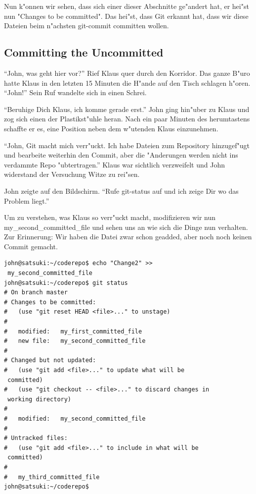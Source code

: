 Nun k"onnen wir sehen, dass sich einer dieser Abschnitte ge"andert hat, er hei"st nun "Changes to be committed". Das hei"st, dass Git erkannt hat, dass wir diese Dateien beim n"achsten git-commit committen wollen.

\subsection{Committing the Uncommitted}

\begin{trenches}
``John, was geht hier vor?'' Rief Klaus quer durch den Korridor. Das ganze B"uro hatte Klaus in den letzten 15 Minuten die H"ande auf den Tisch schlagen h"oren.  ``John!'' Sein Ruf wandelte sich in einen Schrei.

``Beruhige Dich Klaus, ich komme gerade erst.'' John ging hin"uber zu Klaus und zog sich einen der Plastikst"uhle heran. Nach ein paar Minuten des herumtastens
schaffte er es, eine Position neben dem w"utenden Klaus einzunehmen.

``John, Git macht mich verr"uckt. Ich habe Dateien zum Repository hinzugef"ugt und bearbeite weiterhin den Commit, aber die "Anderungen werden nicht ins verdammte Repo "ubtertragen.'' Klaus war sichtlich verzweifelt und John widerstand der Versuchung Witze zu rei"sen.

John zeigte auf den Bildschirm. ``Rufe git-status auf und ich zeige Dir wo das Problem liegt.''
\end{trenches}

Um zu verstehen, was Klaus so verr"uckt macht, modifizieren wir nun my\_second\_committed\_file und sehen uns an wie sich die Dinge nun verhalten. Zur Erinnerung: Wir haben die Datei zwar schon geadded, aber noch noch keinen Commit gemacht.

\begin{Verbatim}
john@satsuki:~/coderepo$ echo "Change2" >> 
 my_second_committed_file 
john@satsuki:~/coderepo$ git status
# On branch master
# Changes to be committed:
#   (use "git reset HEAD <file>..." to unstage)
#
#	modified:   my_first_committed_file
#	new file:   my_second_committed_file
#
# Changed but not updated:
#   (use "git add <file>..." to update what will be 
 committed)
#   (use "git checkout -- <file>..." to discard changes in 
 working directory)
#
#	modified:   my_second_committed_file
#
# Untracked files:
#   (use "git add <file>..." to include in what will be 
 committed)
#
#	my_third_committed_file
john@satsuki:~/coderepo$ 
\end{Verbatim} 

